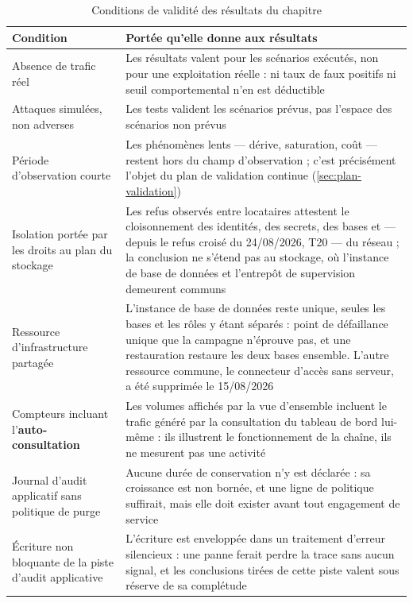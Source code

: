 \begin{table}[!htbp]
\caption{Conditions de validité des résultats du chapitre}
\label{tab:limites}
\centering
\footnotesize
\setlength{\tabcolsep}{3pt}
\begin{tabular}{|P{3.9cm}|P{11.4cm}|}
\hline
\textbf{Condition} & \textbf{Portée qu'elle donne aux résultats} \\
\hline
Absence de trafic réel & Les résultats valent pour les scénarios exécutés, non pour une
exploitation réelle : ni taux de faux positifs ni seuil comportemental n'en est déductible \\ \hline
Attaques simulées, non adverses & Les tests valident les scénarios prévus, pas l'espace des
scénarios non prévus \\ \hline
Période d'observation courte & Les phénomènes lents --- dérive, saturation, coût --- restent hors
du champ d'observation ; c'est précisément l'objet du plan de validation continue
(\cref{sec:plan-validation}) \\ \hline
Isolation portée par les droits au plan du stockage & Les refus observés entre locataires
attestent le cloisonnement des identités, des secrets, des bases et --- depuis le refus croisé du
24/08/2026, T20 --- du réseau ; la conclusion ne s'étend pas au stockage, où l'instance de base de
données et l'entrepôt de supervision demeurent communs \\ \hline
Ressource d'infrastructure partagée & L'instance de base de données reste unique, seules les bases
et les rôles y étant séparés : point de défaillance unique que la campagne n'éprouve pas, et une
restauration restaure les deux bases ensemble. L'autre ressource commune, le connecteur d'accès
sans serveur, a été supprimée le 15/08/2026 \\ \hline
Compteurs incluant l'\textbf{auto-consultation} & Les volumes affichés par la vue d'ensemble
incluent le trafic généré par la consultation du tableau de bord lui-même : ils illustrent le
fonctionnement de la chaîne, ils ne mesurent pas une activité \\ \hline
Journal d'audit applicatif sans politique de purge & Aucune durée de conservation n'y est
déclarée : sa croissance est non bornée, et une ligne de politique suffirait, mais elle doit
exister avant tout engagement de service \\ \hline
Écriture non bloquante de la piste d'audit applicative & L'écriture est enveloppée dans un
traitement d'erreur silencieux : une panne ferait perdre la trace sans aucun signal, et les
conclusions tirées de cette piste valent sous réserve de sa complétude \\ \hline

\end{tabular}
\end{table}
